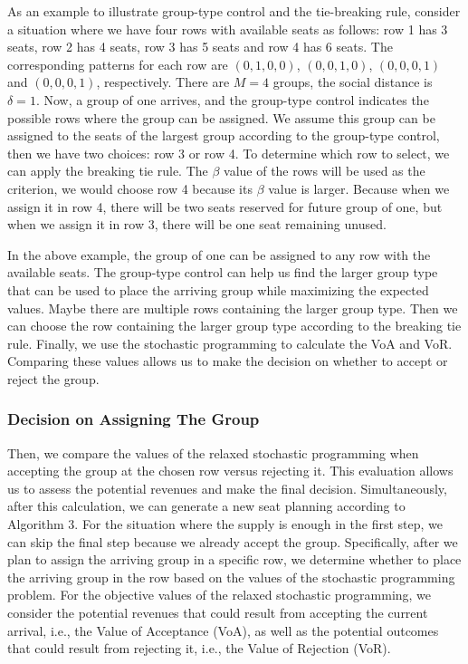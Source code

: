 As an example to illustrate group-type control and the tie-breaking rule, consider a situation where we have four rows with available seats as follows: row 1 has 3 seats, row 2 has 4 seats, row 3 has 5 seats and row 4 has 6 seats. The corresponding patterns for each row are $(0,1,0,0)$, $(0,0,1,0)$, $(0,0,0,1)$ and $(0,0,0,1)$, respectively. There are $M =4$ groups, the social distance is $\delta =1$. Now, a group of one arrives,  and the group-type control indicates the possible rows where the group can be assigned. We assume this group can be assigned to the seats of the largest group according to the group-type control, then we have two choices: row 3 or row 4. To determine which row to select, we can apply the breaking tie rule. The $\beta$ value of the rows will be used as the criterion, we would choose row 4 because its $\beta$ value is larger. Because when we assign it in row 4, there will be two seats reserved for future group of one, but when we assign it in row 3, there will be one seat remaining unused.

In the above example, the group of one can be assigned to any row with the available seats. The group-type control can help us find the larger group type that can be used to place the arriving group while maximizing the expected values. Maybe there are multiple rows containing the larger group type. Then we can choose the row containing the larger group type according to the breaking tie rule. 
Finally, we use the stochastic programming to calculate the VoA and VoR. Comparing these values allows us to make the decision on whether to accept or reject the group.



\subsubsection*{Decision on Assigning The Group}
Then, we compare the values of the relaxed stochastic programming when accepting the group at the chosen row versus rejecting it. This evaluation allows us to assess the potential revenues and make the final decision. Simultaneously, after this calculation, we can generate a new seat planning according to Algorithm 3. For the situation where the supply is enough in the first step, we can skip the final step because we already accept the group. Specifically, after we plan to assign the arriving group in a specific row, we determine whether to place the arriving group in the row based on the values of the stochastic programming problem. For the objective values of the relaxed stochastic programming, we consider the potential revenues that could result from accepting the current arrival, i.e., the Value of Acceptance (VoA), as well as the potential outcomes that could result from rejecting it, i.e., the Value of Rejection (VoR). 

